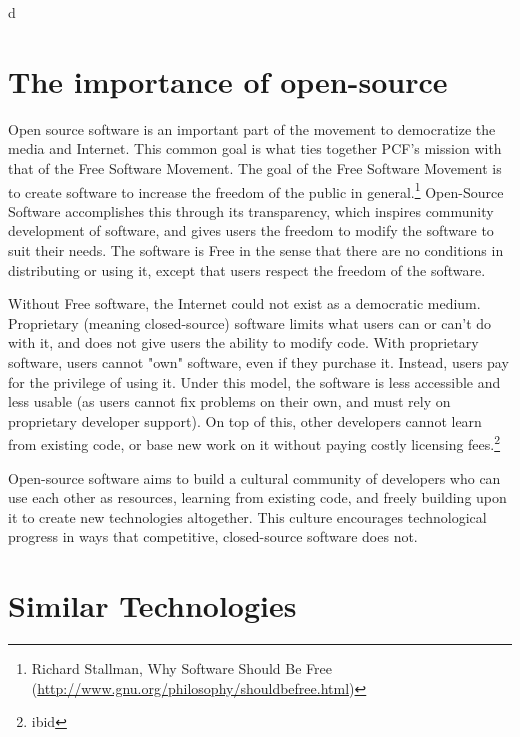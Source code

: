 d\documentclass[a4paper,12pt]{report}
\begin{document}
\section {The importance of open-source}
	Open source software is an important part of the movement to democratize the media and Internet. This common goal is what ties together PCF's mission with that of the Free Software Movement. The goal of the Free Software Movement is to create software to increase the freedom of the public in general.\footnote{Richard Stallman, Why Software Should Be Free (\url{http://www.gnu.org/philosophy/shouldbefree.html})} Open-Source Software accomplishes this through its transparency, which inspires community development of software, and gives users the freedom to modify the software to suit their needs. The software is Free in the sense that there are no conditions in distributing or using it, except that users respect the freedom of the software.

	Without Free software, the Internet could not exist as a democratic medium. Proprietary (meaning closed-source) software limits what users can or can't do with it, and does not give users the ability to modify code. With proprietary software, users cannot "own" software, even if they purchase it. Instead, users pay for the privilege of using it. Under this model, the software is less accessible and less usable (as users cannot fix problems on their own, and must rely on proprietary developer support). On top of this, other developers cannot learn from existing code, or base new work on it without paying costly licensing fees.\footnote{ibid}

	Open-source software aims to build a cultural community of developers who can use each other as resources, learning from existing code, and freely building upon it to create new technologies altogether. This culture encourages technological progress in ways that competitive, closed-source software does not.

\section {Similar Technologies}
\end{document}
